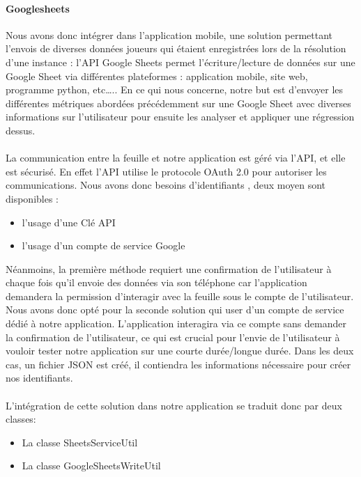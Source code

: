 \documentclass[a4paper, 10pt]{article}
\begin{document}
\paragraph{Googlesheets}
Nous avons donc intégrer dans l’application mobile, une solution permettant l’envois de diverses données joueurs qui étaient enregistrées lors de la résolution d’une instance : l’API Google Sheets permet l’écriture/lecture de données sur une Google Sheet via différentes plateformes : application mobile, site web, programme python, etc….. 
En ce qui nous concerne, notre but est d’envoyer les différentes métriques abordées précédemment sur une Google Sheet avec diverses informations sur l’utilisateur pour ensuite les analyser et appliquer une régression dessus.

\paragraph{}
La communication entre la feuille et notre application est géré via l’API, et elle est sécurisé. En effet l’API utilise le protocole OAuth 2.0 pour autoriser les communications. Nous avons donc besoins d’identifiants , deux moyen sont disponibles :
 \begin{itemize}
\item l’usage d’une Clé API
\item l’usage d’un compte de service Google
\end{itemize}
Néanmoins, la première méthode requiert une confirmation de l’utilisateur à chaque fois qu’il envoie des données via son téléphone car l’application demandera la permission d'interagir avec la feuille sous le compte de l’utilisateur. Nous avons donc opté pour la seconde solution qui user d’un compte de service dédié à notre application. L’application interagira via ce compte sans demander la confirmation de l’utilisateur, ce qui est crucial pour l’envie de l’utilisateur à vouloir tester notre application sur une courte durée/longue durée.
Dans les deux cas, un fichier JSON est créé, il contiendra les informations nécessaire pour créer nos identifiants.

\paragraph{}
L’intégration de cette solution dans notre application se traduit donc par deux classes:
 \begin{itemize}
\item La classe SheetsServiceUtil
\item La classe GoogleSheetsWriteUtil
\end{itemize}
\end{document}
